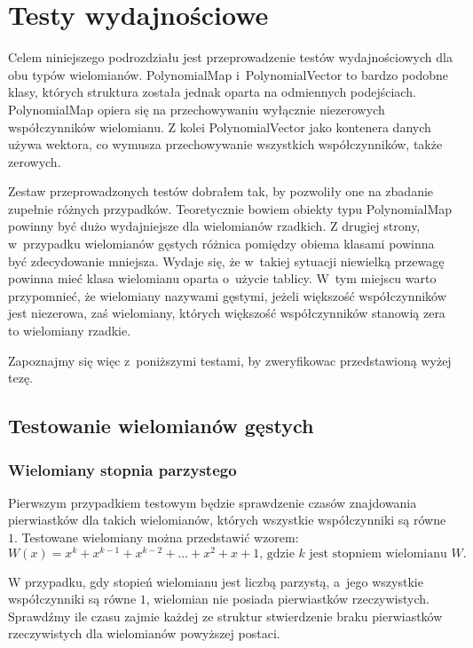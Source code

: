 \section{Testy wydajnościowe}

Celem niniejszego podrozdziału jest przeprowadzenie testów wydajnościowych dla obu typów wielomianów. PolynomialMap i~PolynomialVector to bardzo podobne klasy, których struktura została jednak oparta na odmiennych podejściach. PolynomialMap opiera się na przechowywaniu wyłącznie niezerowych współczynników wielomianu. Z kolei PolynomialVector jako kontenera danych używa wektora, co wymusza przechowywanie wszystkich współczynników, także zerowych.

Zestaw przeprowadzonych testów dobrałem tak, by pozwoliły one na zbadanie zupełnie różnych przypadków. Teoretycznie bowiem obiekty typu PolynomialMap powinny być dużo wydajniejsze dla wielomianów rzadkich. Z drugiej strony, w~przypadku wielomianów gęstych różnica pomiędzy obiema klasami powinna być zdecydowanie mniejsza. Wydaje się, że w~takiej sytuacji niewielką przewagę powinna mieć klasa wielomianu oparta o~użycie tablicy. W~tym miejscu warto przypomnieć, że wielomiany nazywami gęstymi, jeżeli większość współczynników jest niezerowa, zaś wielomiany, których większość współczynników stanowią zera to wielomiany rzadkie.

Zapoznajmy się więc z~poniższymi testami, by zweryfikowac przedstawioną wyżej tezę.

\subsection{Testowanie wielomianów gęstych}

\subsubsection{Wielomiany stopnia parzystego}

Pierwszym przypadkiem testowym będzie sprawdzenie czasów znajdowania pierwiastków dla takich wielomianów, których wszystkie współczynniki są równe $1$. Testowane wielomiany można przedstawić wzorem:
\begin{equation*}
W(x) = x^k + x^{k-1} + x^{k-2} + ... + x^2 + x + 1\text{, gdzie } k \text{ jest stopniem wielomianu } W \text {.}
\end{equation*}


W przypadku, gdy stopień wielomianu jest liczbą parzystą, a~jego wszystkie współczynniki są równe $1$, wielomian nie posiada pierwiastków rzeczywistych. Sprawdźmy ile czasu zajmie każdej ze struktur stwierdzenie braku pierwiastków rzeczywistych dla wielomianów powyższej postaci.

